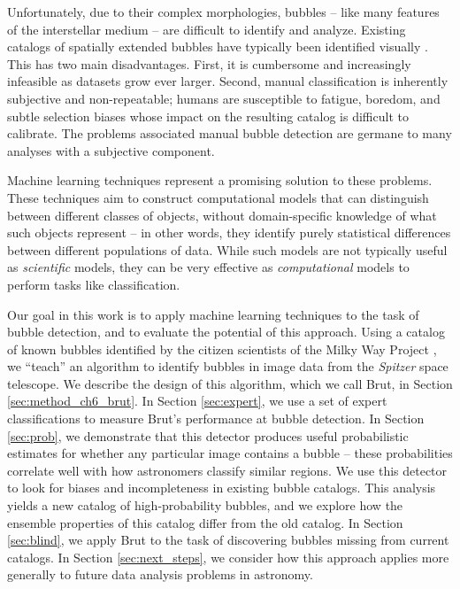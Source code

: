 Unfortunately, due to their complex morphologies, bubbles -- like many features of the interstellar medium -- are difficult to identify and analyze. Existing catalogs of spatially extended bubbles have typically been identified visually \citep{Churchwell06, Churchwell07, Simpson12, Helfand06}. This has two main disadvantages. First, it is cumbersome and increasingly infeasible as datasets grow ever larger. Second, manual classification is inherently subjective and non-repeatable; humans are susceptible to fatigue, boredom, and subtle selection biases whose impact on the resulting catalog is difficult to calibrate. The problems associated manual bubble detection are germane to many analyses with a subjective component.

Machine learning techniques represent a promising solution to these problems. These techniques aim to construct computational models that can distinguish between different classes of objects, without domain-specific knowledge of what such objects represent -- in other words, they identify purely statistical differences between different populations of data. While such models are not typically useful as \textit{scientific} models, they can be very effective as \textit{computational} models to perform tasks like classification.

Our goal in this work is to apply machine learning techniques to the task of bubble detection, and to evaluate the potential of this approach. Using a catalog of known bubbles identified by the citizen scientists of the Milky Way Project \citep{Simpson12}, we ``teach'' an algorithm to identify bubbles in image data from the \textit{Spitzer} space telescope. We describe the design of this algorithm, which we call Brut, in Section \ref{sec:method_ch6_brut}. In Section \ref{sec:expert}, we use a set of expert classifications to measure Brut's performance at bubble detection. In Section \ref{sec:prob}, we demonstrate that this detector produces useful probabilistic estimates for whether any particular image contains a bubble -- these probabilities correlate well with how astronomers classify similar regions. We use this detector to look for biases and incompleteness in existing bubble catalogs. This analysis yields a new catalog of high-probability bubbles, and we explore how the ensemble properties of this catalog differ from the old catalog. In Section \ref{sec:blind}, we apply Brut to the task of discovering bubbles missing from current catalogs. In Section \ref{sec:next_steps}, we consider how this approach applies more generally to future data analysis problems in astronomy.

